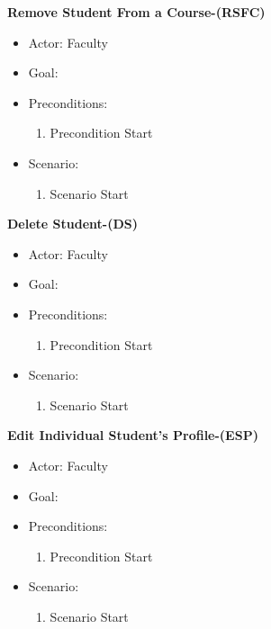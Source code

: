 \documentclass[letterpaper,12pt,oneside,listof=totoc]{scrreprt}
\begin{document}
\hfill \break
\textbf{Remove Student From a Course-(RSFC)}
\begin{itemize}
    \item Actor: Faculty
    \item Goal:
    \item Preconditions:
    \begin{enumerate}
        \item Precondition Start
    \end{enumerate}
    \item Scenario:
    \begin{enumerate}
        \item Scenario Start
    \end{enumerate}
\end{itemize}

\hfill \break
\textbf{Delete Student-(DS)}
\begin{itemize}
    \item Actor: Faculty
    \item Goal:
    \item Preconditions:
    \begin{enumerate}
        \item Precondition Start
    \end{enumerate}
    \item Scenario:
    \begin{enumerate}
        \item Scenario Start
    \end{enumerate}
\end{itemize}

\hfill \break
\textbf{Edit Individual Student's Profile-(ESP)}
\begin{itemize}
    \item Actor: Faculty
    \item Goal:
    \item Preconditions:
    \begin{enumerate}
        \item Precondition Start
    \end{enumerate}
    \item Scenario:
    \begin{enumerate}
        \item Scenario Start
    \end{enumerate}
\end{itemize}
\end{document}

